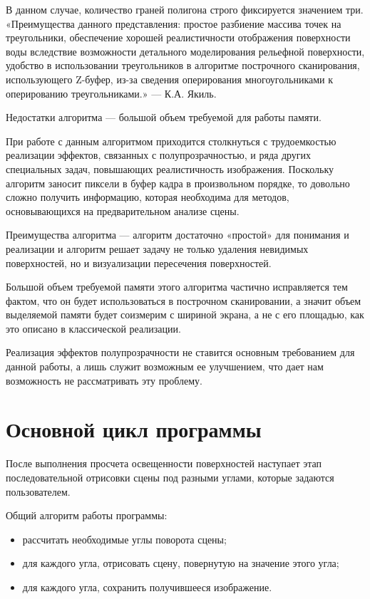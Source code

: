 В данном случае, количество граней полигона строго фиксируется значением три. «Преимущества данного представления: простое разбиение массива точек на треугольники, обеспечение хорошей реалистичности отображения поверхности воды вследствие возможности детального моделирования рельефной поверхности, удобство в использовании треугольников в алгоритме построчного сканирования, использующего Z-буфер, из-за сведения оперирования многоугольниками к оперированию треугольниками.» --- К.А. Якиль.

Недостатки алгоритма --- большой объем требуемой для работы памяти. 

При работе с данным алгоритмом приходится столкнуться с трудоемкостью реализации эффектов, связанных с полупрозрачностью, и ряда других специальных задач, повышающих реалистичность изображения. Поскольку алгоритм заносит пиксели в буфер кадра в произвольном порядке, то довольно сложно получить информацию, которая необходима для методов, основывающихся на предварительном анализе сцены.

Преимущества алгоритма --- алгоритм достаточно «простой» для понимания и реализации и алгоритм решает задачу не только удаления невидимых поверхностей, но и визуализации пересечения поверхностей.

Большой объем требуемой памяти этого алгоритма частично исправляется тем фактом, что он будет использоваться в построчном сканировании, а значит объем выделяемой памяти будет соизмерим с шириной экрана, а не с его площадью, как это описано в классической реализации.

Реализация эффектов полупрозрачности не ставится основным требованием для данной работы, а лишь служит возможным ее улучшением, что дает нам возможность не рассматривать эту проблему.

\section{Основной цикл программы}

После выполнения просчета освещенности поверхностей наступает этап последовательной отрисовки сцены под разными углами, которые задаются пользователем.

Общий алгоритм работы программы:
\begin{itemize}
	\item рассчитать необходимые углы поворота сцены;
	\item для каждого угла, отрисовать сцену, повернутую на значение этого угла;
	\item для каждого угла, сохранить получившееся изображение.
\end{itemize}

